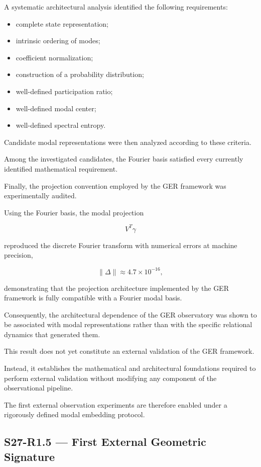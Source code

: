 A systematic architectural analysis identified the following requirements:

\begin{itemize}
\item complete state representation;
\item intrinsic ordering of modes;
\item coefficient normalization;
\item construction of a probability distribution;
\item well-defined participation ratio;
\item well-defined modal center;
\item well-defined spectral entropy.
\end{itemize}

Candidate modal representations were then analyzed according to these criteria.

Among the investigated candidates, the Fourier basis satisfied every currently identified mathematical requirement.

Finally, the projection convention employed by the GER framework was experimentally audited.

Using the Fourier basis, the modal projection

\[
V^{T}\gamma
\]

reproduced the discrete Fourier transform with numerical errors at machine precision,

\[
\|\Delta\|
\approx
4.7\times10^{-16},
\]

demonstrating that the projection architecture implemented by the GER framework is fully compatible with a Fourier modal basis.

Consequently, the architectural dependence of the GER observatory was shown to be associated with modal representations rather than with the specific relational dynamics that generated them.

This result does not yet constitute an external validation of the GER framework.

Instead, it establishes the mathematical and architectural foundations required to perform external validation without modifying any component of the observational pipeline.

The first external observation experiments are therefore enabled under a rigorously defined modal embedding protocol.

\subsection{S27-R1.5 — First External Geometric Signature}

